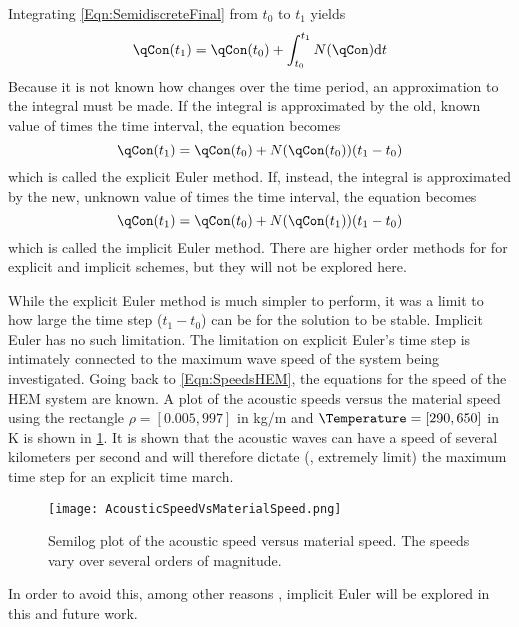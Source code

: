 Integrating \cref{Eqn:SemidiscreteFinal} from $t_0$ to $t_1$ yields
\begin{equation}
    \qCon(t_1) = \qCon(t_0) + \int_{t_0}^{t_1} N(\qCon) \mathrm{d}t
\end{equation}
Because it is not known how \qCon changes over the time period, an approximation to the integral must be made.
If the integral is approximated by the old, known value of \qCon times the time interval, the equation becomes
\begin{equation}
    \qCon(t_1) = \qCon(t_0) + N(\qCon(t_0)) (t_1 - t_0)
\end{equation}
which is called the explicit Euler method.
If, instead, the integral is approximated by the new, unknown value of \qCon times the time interval, the equation becomes
\begin{equation}
    \qCon(t_1) = \qCon(t_0) + N(\qCon(t_1)) (t_1 - t_0)
\end{equation}
which is called the implicit Euler method.
There are higher order methods for for explicit and implicit schemes, but they will not be explored here.

While the explicit Euler method is much simpler to perform, it was a limit to how large the time step ($t_1 - t_0$) can be for the solution to be stable.
Implicit Euler has no such limitation.
The limitation on explicit Euler's time step is intimately connected to the maximum wave speed of the system being investigated.
Going back to \cref{Eqn:SpeedsHEM}, the equations for the speed of the HEM system are known.
A plot of the acoustic speeds versus the material speed using the rectangle $\rho = [0.005,997]$ in kg/m and $\Temperature = [290,650]$ in K is shown in \cref{Figure:AcousticVSMaterial}.
It is shown that the acoustic waves can have a speed of several kilometers per second and will therefore dictate (\ie, extremely limit) the maximum time step for an explicit time march.
\begin{figure}%
    \centering
    \caption[Acoustic speed versus material speed]{Semilog plot of the acoustic speed versus material speed.  The speeds vary over several orders of magnitude.}%
    \label{Figure:AcousticVSMaterial}%
    \texttt{[image: AcousticSpeedVsMaterialSpeed.png]}%
\end{figure}
In order to avoid this, among other reasons \cite{gottlieb_high_2009}, implicit Euler will be explored in this and future work.

